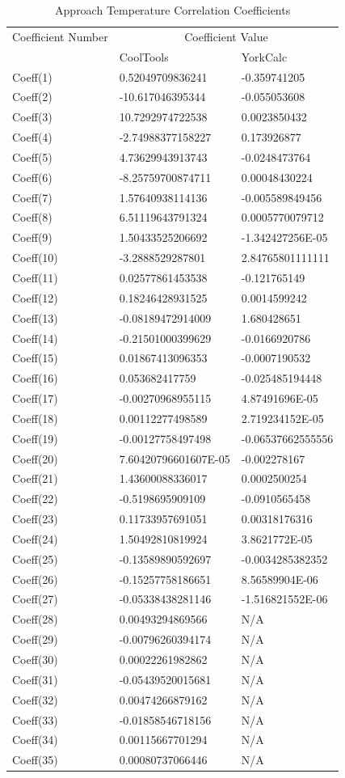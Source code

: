 \begin{longtable}[c]{p{2.0in}p{2.0in}p{2.0in}}

\caption{Approach Temperature Correlation Coefficients \protect \label{table:approach-temperature-correlation-coefficients}}\\
\toprule 
Coefficient Number & \multicolumn{2}{c}{Coefficient Value} \tabularnewline
 & CoolTools & YorkCalc \tabularnewline \midrule
\endhead
Coeff(1) & 0.52049709836241 & -0.359741205 \tabularnewline
Coeff(2) & -10.617046395344 & -0.055053608 \tabularnewline
Coeff(3) & 10.7292974722538 & 0.0023850432 \tabularnewline
Coeff(4) & -2.74988377158227 & 0.173926877 \tabularnewline
Coeff(5) & 4.73629943913743 & -0.0248473764 \tabularnewline
Coeff(6) & -8.25759700874711 & 0.00048430224 \tabularnewline
Coeff(7) & 1.57640938114136 & -0.005589849456 \tabularnewline
Coeff(8) & 6.51119643791324 & 0.0005770079712 \tabularnewline
Coeff(9) & 1.50433525206692 & -1.342427256E-05 \tabularnewline
Coeff(10) & -3.2888529287801 & 2.84765801111111 \tabularnewline
Coeff(11) & 0.02577861453538 & -0.121765149 \tabularnewline
Coeff(12) & 0.18246428931525 & 0.0014599242 \tabularnewline
Coeff(13) & -0.08189472914009 & 1.680428651 \tabularnewline
Coeff(14) & -0.21501000399629 & -0.0166920786 \tabularnewline
Coeff(15) & 0.01867413096353 & -0.0007190532 \tabularnewline
Coeff(16) & 0.053682417759 & -0.025485194448 \tabularnewline
Coeff(17) & -0.00270968955115 & 4.87491696E-05 \tabularnewline
Coeff(18) & 0.00112277498589 & 2.719234152E-05 \tabularnewline
Coeff(19) & -0.00127758497498 & -0.06537662555556 \tabularnewline
Coeff(20) & 7.60420796601607E-05 & -0.002278167 \tabularnewline
Coeff(21) & 1.43600088336017 & 0.0002500254 \tabularnewline
Coeff(22) & -0.5198695909109 & -0.0910565458 \tabularnewline
Coeff(23) & 0.11733957691051 & 0.00318176316 \tabularnewline
Coeff(24) & 1.50492810819924 & 3.8621772E-05 \tabularnewline
Coeff(25) & -0.13589890592697 & -0.0034285382352 \tabularnewline
Coeff(26) & -0.15257758186651 & 8.56589904E-06 \tabularnewline
Coeff(27) & -0.05338438281146 & -1.516821552E-06 \tabularnewline
Coeff(28) & 0.00493294869566 & N/A \tabularnewline
Coeff(29) & -0.00796260394174 & N/A \tabularnewline
Coeff(30) & 0.00022261982862 & N/A \tabularnewline
Coeff(31) & -0.05439520015681 & N/A \tabularnewline
Coeff(32) & 0.00474266879162 & N/A \tabularnewline
Coeff(33) & -0.01858546718156 & N/A \tabularnewline
Coeff(34) & 0.00115667701294 & N/A \tabularnewline
Coeff(35) & 0.00080737066446 & N/A \tabularnewline
\bottomrule
\end{longtable}

